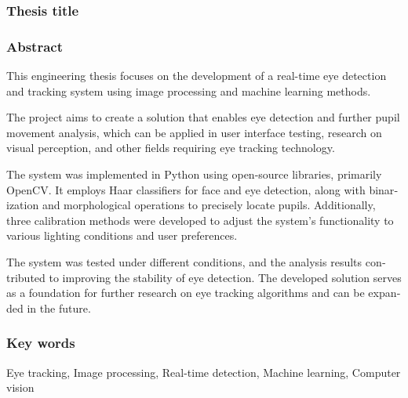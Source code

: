 \documentclass[a4paper,twoside,12pt]{book}
\begin{document}
\subsubsection*{Thesis title} 
\begin{otherlanguage}{british}
\TitleAlt
\end{otherlanguage}

\subsubsection*{Abstract} 
\begin{otherlanguage}{british}
	This engineering thesis focuses on the development of a real-time eye detection and tracking system using image processing and machine learning methods.

	The project aims to create a solution that enables eye detection and further pupil movement analysis, which can be applied in user interface testing, research on visual perception, and other fields requiring eye tracking technology.
	
	The system was implemented in Python using open-source libraries, primarily OpenCV. It employs Haar classifiers for face and eye detection, along with binarization and morphological operations to precisely locate pupils. Additionally, three calibration methods were developed to adjust the system's functionality to various lighting conditions and user preferences.
	
	The system was tested under different conditions, and the analysis results contributed to improving the stability of eye detection. The developed solution serves as a foundation for further research on eye tracking algorithms and can be expanded in the future.
\end{otherlanguage}
\subsubsection*{Key words}  
\begin{otherlanguage}{british}
	Eye tracking, Image processing, Real-time detection, Machine learning, Computer vision
\end{otherlanguage}




\tableofcontents
\end{document}
